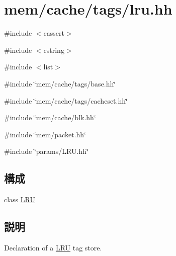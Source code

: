 \hypertarget{lru_8hh}{
\section{mem/cache/tags/lru.hh}
\label{lru_8hh}
}
{\ttfamily \#include $<$cassert$>$}\par
{\ttfamily \#include $<$cstring$>$}\par
{\ttfamily \#include $<$list$>$}\par
{\ttfamily \#include \char`\"{}mem/cache/tags/base.hh\char`\"{}}\par
{\ttfamily \#include \char`\"{}mem/cache/tags/cacheset.hh\char`\"{}}\par
{\ttfamily \#include \char`\"{}mem/cache/blk.hh\char`\"{}}\par
{\ttfamily \#include \char`\"{}mem/packet.hh\char`\"{}}\par
{\ttfamily \#include \char`\"{}params/LRU.hh\char`\"{}}\par
\subsection*{構成}
\begin{DoxyCompactItemize}
\item 
class \hyperlink{classLRU}{LRU}
\end{DoxyCompactItemize}


\subsection{説明}
Declaration of a \hyperlink{classLRU}{LRU} tag store. 